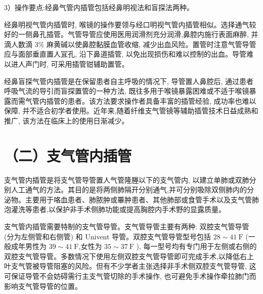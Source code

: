 \documentclass[10pt]{article}
\begin{document}
3）操作要点:经鼻气管内插管包括经鼻明视法和盲探法两种。

经鼻明视气管内插管时, 喉镜的操作要领与经口明视气管内插管相似。选择通气较好的一侧鼻孔插管。气管导管应使用医用润滑剂充分润滑,鼻腔内施行表面麻醉, 并滴人数滴 $3 \%$ 麻黄碱以使鼻腔黏膜血管收缩, 减少出血风险。置管时注意气管导管应与面部垂直置人冝孔, 沿下鼻道插管, 以免出现损伤和难以控制的出血。导管难以进人声门时, 可采用插管钳辅助置管。

经鼻盲探气管内插管是在保留患者自主呼吸的情况下, 导管置人鼻腔后, 通过患者呼吸气流的导引而盲探置管的一种方法, 既往多用于喉镜暴露困难或不适于喉镜暴露而需气管内插管的患者。该方法要求操作者具备丰富的插管经验, 成功率也难以保障, 并不适合初学者使用。近年来,随着纤维支气管镜等辅助插管技术日益成熟和推广, 该方法在临床上的使用日渐减少。

\section*{（二）支气管内插管}
支气管内插管是将支气管导管置人气管隆塍以下的支气管内, 以建立单肺或双肺分别人工通气的方法。其目的是将两侧肺隔开分别通气,并可分别吸除双侧肺内的分泌物。主要用于咯血患者、肺脓肿或罼肿患者、其他肺部或食管手术以及支气管肺泡灌洗等患者,以保护非手术侧肺功能或提高胸腔内手术野的显露质量。

支气管内插管需要特制的支气管导管。支气管导管主要有两种: 双腔支气管导管 (分为左侧管和右侧管) 和 Univent 导管。双腔支气管导管型号包括 $28 \sim 41 \mathrm{~F}$ (一般成年男性为 $39 \sim 41 \mathrm{~F}$,女性为 $35 \sim 37 \mathrm{~F}$ ), 每一型号均有专门用于左侧或右侧的双腔支气管导管。多数情况下使用左侧双腔支气管导管即可完成手术,以降低右上叶支气管被导管阻塞的风险。但有不少学者主张选择非手术侧双腔支气管导管, 这可保证导管不会妨碍需行主支气管切除的手术操作, 也可避免手术操作牵拉肺门而影响支气管导管的位置。
\end{document}
